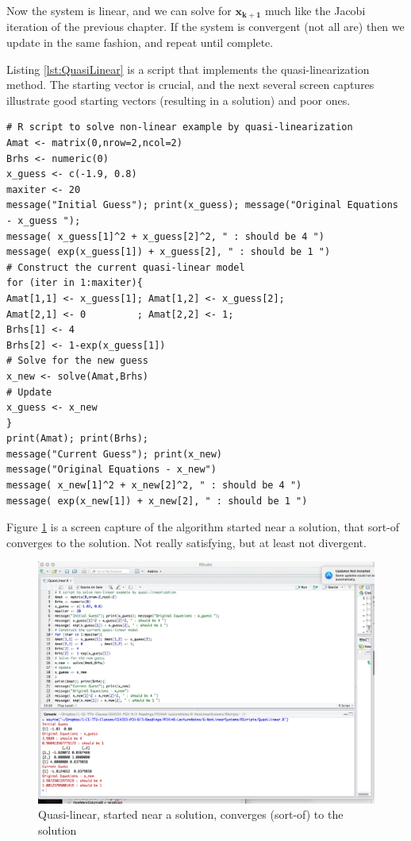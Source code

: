 Now the system is linear, and we can solve for $\mathbf{x_{k+1}}$ much like the Jacobi iteration of the previous chapter.  If the system is convergent (not all are) then we update in the same fashion, and repeat until complete.

Listing \ref{lst:QuasiLinear} is a script that implements the quasi-linearization method.  
The starting vector is crucial, and the next several screen captures illustrate good starting vectors (resulting in a solution) and poor ones.
\newpage
\begin{lstlisting}[caption=R code demonstrating Non-Linear by quasi-linearization , label=lst:QuasiLinear]
# R script to solve non-linear example by quasi-linearization
Amat <- matrix(0,nrow=2,ncol=2)
Brhs <- numeric(0)
x_guess <- c(-1.9, 0.8)
maxiter <- 20
message("Initial Guess"); print(x_guess); message("Original Equations - x_guess "); 
message( x_guess[1]^2 + x_guess[2]^2, " : should be 4 ")
message( exp(x_guess[1]) + x_guess[2], " : should be 1 ")
# Construct the current quasi-linear model
for (iter in 1:maxiter){
Amat[1,1] <- x_guess[1]; Amat[1,2] <- x_guess[2];
Amat[2,1] <- 0         ; Amat[2,2] <- 1;
Brhs[1] <- 4
Brhs[2] <- 1-exp(x_guess[1])
# Solve for the new guess
x_new <- solve(Amat,Brhs)
# Update
x_guess <- x_new
}
print(Amat); print(Brhs);
message("Current Guess"); print(x_new)
message("Original Equations - x_new")
message( x_new[1]^2 + x_new[2]^2, " : should be 4 ")
message( exp(x_new[1]) + x_new[2], " : should be 1 ")
\end{lstlisting}

Figure \ref{fig:QuasiLinear-Works1} is a screen capture of the algorithm started near a solution, that sort-of converges to the solution.  Not really satisfying, but at least not divergent.

\begin{figure}[h!] %
   \centering
   \includegraphics[width=6in]{./6-NonLinearSystems/QuasiLinear-Works1.jpg} 
   \caption{Quasi-linear, started near a solution, converges (sort-of) to the solution}
   \label{fig:QuasiLinear-Works1}
\end{figure}
\clearpage

